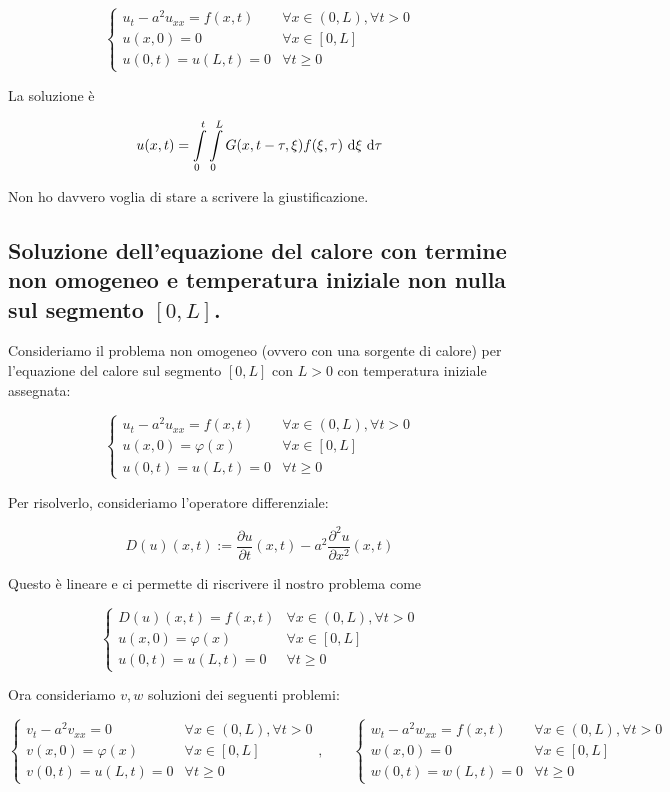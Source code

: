 \documentclass{article}
\begin{document}
\[ \begin{cases} u_t - a^2 u_{xx} = f(x,t) & \forall x \in (0,L), \forall t > 0 \\ u(x,0) = 0 & \forall x \in [0,L] \\ u(0,t) = u(L,t) = 0 & \forall t \ge 0 \end{cases}\]

La soluzione è 

\[ u(x,t) = \intop_0^t\intop_0^L G(x,t-\tau,\xi)f(\xi,\tau)\de\xi\de\tau \]

Non ho davvero voglia di stare a scrivere la giustificazione.

\subsection{Soluzione dell'equazione del calore con termine non omogeneo e temperatura iniziale non nulla sul segmento $[0,L]$.}

Consideriamo il problema non omogeneo (ovvero con una sorgente di calore) per l'equazione del calore sul segmento $[0,L]$ con $L>0$ con temperatura iniziale assegnata:

\[ \begin{cases} u_t - a^2 u_{xx} = f(x,t) & \forall x \in (0,L), \forall t > 0 \\ u(x,0) = \varphi(x) & \forall x \in [0,L] \\ u(0,t) = u(L,t) = 0 & \forall t \ge 0 \end{cases}\]

Per risolverlo, consideriamo l'operatore differenziale:

\[ D(u)(x,t) := \frac{\partial u}{\partial t}(x,t) - a^2 \frac{\partial^2 u}{\partial x^2}(x,t) \]

Questo è lineare e ci permette di riscrivere il nostro problema come  

\[ \begin{cases} D(u)(x,t) = f(x,t) & \forall x \in (0,L), \forall t > 0 \\ u(x,0) = \varphi(x) & \forall x \in [0,L] \\ u(0,t) = u(L,t) = 0 & \forall t \ge 0 \end{cases}\]

Ora consideriamo $v,w$ soluzioni dei seguenti problemi:

\[ \begin{cases} v_t - a^2 v_{xx} = 0 & \forall x \in (0,L), \forall t > 0 \\ v(x,0) = \varphi(x) & \forall x \in [0,L] \\ v(0,t) = u(L,t) = 0 & \forall t \ge 0 \end{cases}, \qquad \begin{cases} w_t - a^2 w_{xx} = f(x,t) & \forall x \in (0,L), \forall t > 0 \\ w(x,0) = 0 & \forall x \in [0,L] \\ w(0,t) = w(L,t) = 0 & \forall t \ge 0 \end{cases}\]
\end{document}
